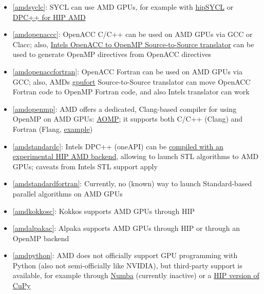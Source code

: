 \begin{frame}[allowframebreaks]
\begin{itemize}
        \item \ref{amdsyclc}: SYCL can use AMD GPUs, for example with \href{https://github.com/illuhad/hipSYCL}{hipSYCL} or \href{https://github.com/intel/llvm/blob/sycl/sycl/doc/GetStartedGuide.md\#build-dpc-toolchain-with-support-for-hip-amd}{DPC++ for HIP AMD}
        \item \ref{amdopenaccc}: OpenACC C/C++ can be used on AMD GPUs via GCC or Clacc; also, \href{https://github.com/intel/intel-application-migration-tool-for-openacc-to-openmp}{Intel\textquotesingle s OpenACC to OpenMP Source-to-Source translator} can be used to generate OpenMP directives from OpenACC directives
        \item \ref{amdopenaccfortran}: OpenACC Fortran can be used on AMD GPUs via GCC; also, AMD\textquotesingle s \href{https://github.com/intel/intel-application-migration-tool-for-openacc-to-openmp}{gpufort} Source-to-Source translator can move OpenACC Fortran code to OpenMP Fortran code, and also Intel\textquotesingle s translator can work
        \item \ref{amdopenmp}: AMD offers a dedicated, Clang-based compiler for using OpenMP on AMD GPUs: \href{https://github.com/ROCm-Developer-Tools/aomp}{AOMP}; it supports both C/C++ (Clang) and Fortran (Flang, \href{https://github.com/ROCm-Developer-Tools/aomp/tree/aomp-dev/examples/fortran/simple_offload}{example})
        \item \ref{amdstandardc}: Intel\textquotesingle s DPC++ (oneAPI) can be \href{https://intel.github.io/llvm-docs/GetStartedGuide.html\#build-dpc-toolchain-with-support-for-hip-amd}{compiled with an experimental HIP AMD backend}, allowing to launch STL algorithms to AMD GPUs; caveats from Intel\textquotesingle s STL support apply
        \item \ref{amdstandardfortran}: Currently, no (known) way to launch Standard-based parallel algorithms on AMD GPUs
        \item \ref{amdkokkosc}: Kokkos supports AMD GPUs through HIP
        \item \ref{amdalpakac}: Alpaka supports AMD GPUs through HIP or through an OpenMP backend
        \item \ref{amdpython}: AMD does not officially support GPU programming with Python (also not semi-officially like NVIDIA), but third-party support is available, for example through \href{https://numba.pydata.org/numba-doc/latest/roc/index.html}{Numba} (currently inactive) or a \href{https://docs.cupy.dev/en/latest/install.html?highlight=rocm\#building-cupy-for-rocm-from-source}{HIP version of CuPy}

\end{itemize}
\end{frame}
